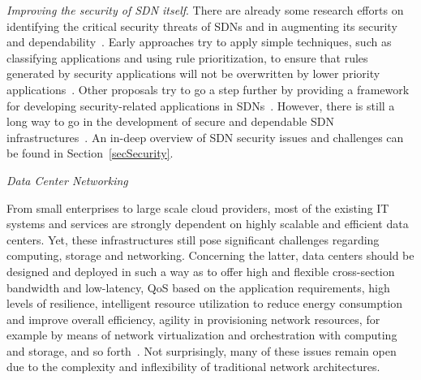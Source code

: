 
\noindent \textit{Improving the security of SDN itself}.
There are already some research efforts on identifying the critical security threats of SDNs and in augmenting its security and dependability~\cite{porras2012,shin2013-1,kreutz2013}.
Early approaches try to apply simple techniques, such as classifying applications and using rule prioritization, to ensure that rules generated by security applications will not be overwritten by 
lower priority applications~\cite{porras2012}. 
Other proposals try to go a step further by providing a framework for developing security-related applications in SDNs~\cite{shin2013-1}.
However, there is still a long way to go in the development of secure and dependable SDN infrastructures~\cite{kreutz2013}.
An in-deep overview of SDN security issues and challenges can be found in Section~\ref{secSecurity}.

\vspace{2mm}
\noindent \textit{Data Center Networking}

From small enterprises to large scale cloud providers, most of the existing IT systems and services are strongly dependent on highly scalable and efficient data centers.
Yet, these infrastructures still pose significant challenges regarding computing, storage and networking.
Concerning the latter, data centers should be designed and deployed in such a way as to offer
high and flexible cross-section bandwidth and low-latency, 
QoS based on the application requirements,
high levels of resilience,
intelligent resource utilization to reduce energy consumption and improve overall efficiency,
agility in provisioning network resources, for example by means of network virtualization and orchestration with computing and storage,
and so forth~\cite{Kant20092939,greenberg2008cost,bari2013}.
Not surprisingly, many of these issues remain open due to the complexity and inflexibility of traditional network architectures.

